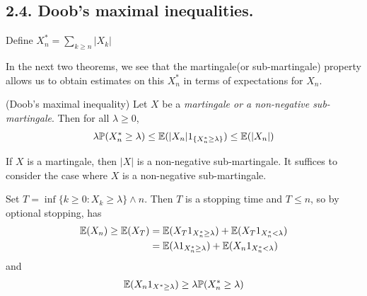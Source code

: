 \documentclass[10pt,a4paper]{report}
\newenvironment{proof}
{\begin{changemargin}{1cm}{0.5cm} 
	}%
	{\end{changemargin}
}
\begin{document}
\subsection*{2.4. Doob's maximal inequalities.}

\quad Define $X_n^* = \sum_{k\geq n} |X_k|$
\s

In the next two theorems, we see that the martingale(or sub-martingale) property allows us to obtain estimates on this $X_n^*$ in terms of expectations for $X_n$.\\
\s

 (Doob's maximal inequality) Let $X$ be a \emph{martingale or a non-negative sub-martingale}. Then for all $\lambda \geq 0$,
\begin{align*}
\lambda \mathbb{P}(X_n^* \geq \lambda) \leq \mathbb{E}(|X_n|   1_{\{ X_n^*\geq \lambda \}}) \leq \mathbb{E}(|X_n|)
\end{align*}
\begin{proof}
\pf If $X$ is a martingale, then $|X|$ is a non-negative sub-martingale. It suffices to consider the case where $X$ is a non-negative sub-martingale.

\quad Set $T = \inf \{ k \geq 0 : X_k \geq \lambda \} \wedge n$. Then $T$ is a stopping time and $T\leq n$, so by optional stopping, has
\begin{align*}
\mathbb{E}(X_n) \geq \mathbb{E}(X_T) &= \mathbb{E}(X_T 1_{X^*_n \geq \lambda}) + \mathbb{E}(X_T 1_{X^*_n < \lambda}) \\
& = \mathbb{E}( \lambda 1_{X^*_n \geq \lambda})  + \mathbb{E}(X_n 1_{X_n^* < \lambda})
\end{align*}
and
\begin{align*}
\mathbb{E}(X_n 1_{X^* \geq \lambda}) \geq \lambda \mathbb{P}(X^*_n \geq \lambda)
\end{align*}

\eop
\end{proof}
\s
\end{document}
